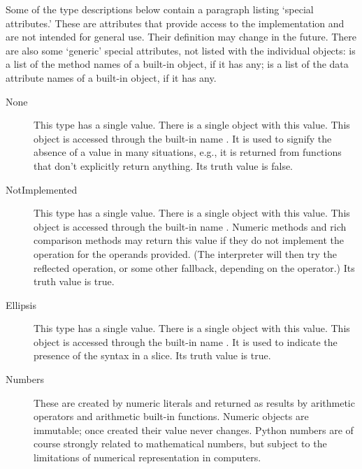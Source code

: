 Some of the type descriptions below contain a paragraph listing
`special attributes.'  These are attributes that provide access to the
implementation and are not intended for general use.  Their definition
may change in the future.  There are also some `generic' special
attributes, not listed with the individual objects: 
is a list of the method names of a built-in object, if it has any;
 is a list of the data attribute names of a built-in
object, if it has any.

\begin{description}

\item[None]
This type has a single value.  There is a single object with this value.
This object is accessed through the built-in name .
It is used to signify the absence of a value in many situations, e.g.,
it is returned from functions that don't explicitly return anything.
Its truth value is false.

\item[NotImplemented]
This type has a single value.  There is a single object with this value.
This object is accessed through the built-in name .
Numeric methods and rich comparison methods may return this value if
they do not implement the operation for the operands provided.  (The
interpreter will then try the reflected operation, or some other
fallback, depending on the operator.)  Its truth value is true.

\item[Ellipsis]
This type has a single value.  There is a single object with this value.
This object is accessed through the built-in name .
It is used to indicate the presence of the  syntax in a
slice.  Its truth value is true.

\item[Numbers]
These are created by numeric literals and returned as results by
arithmetic operators and arithmetic built-in functions.  Numeric
objects are immutable; once created their value never changes.  Python
numbers are of course strongly related to mathematical numbers, but
subject to the limitations of numerical representation in computers.


\end{description}
